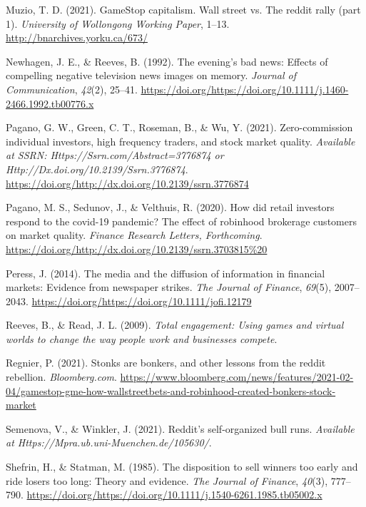 \documentclass[12pt,]{article}
\begin{document}
\leavevmode\hypertarget{ref-dimuzio2021}{}%
Muzio, T. D. (2021). GameStop capitalism. Wall street vs. The reddit
rally (part 1). \emph{University of Wollongong Working Paper}, 1--13.
\url{http://bnarchives.yorku.ca/673/}

\leavevmode\hypertarget{ref-newhagen1992}{}%
Newhagen, J. E., \& Reeves, B. (1992). The evening's bad news: Effects
of compelling negative television news images on memory. \emph{Journal
of Communication}, \emph{42}(2), 25--41.
\url{https://doi.org/https://doi.org/10.1111/j.1460-2466.1992.tb00776.x}

\leavevmode\hypertarget{ref-eaton2021}{}%
Pagano, G. W., Green, C. T., Roseman, B., \& Wu, Y. (2021).
Zero-commission individual investors, high frequency traders, and stock
market quality. \emph{Available at SSRN:
Https://Ssrn.com/Abstract=3776874 or
Http://Dx.doi.org/10.2139/Ssrn.3776874}.
\url{https://doi.org/http://dx.doi.org/10.2139/ssrn.3776874}

\leavevmode\hypertarget{ref-pagano2020}{}%
Pagano, M. S., Sedunov, J., \& Velthuis, R. (2020). How did retail
investors respond to the covid-19 pandemic? The effect of robinhood
brokerage customers on market quality. \emph{Finance Research Letters,
Forthcoming}.
\url{https://doi.org/http://dx.doi.org/10.2139/ssrn.3703815\%20}

\leavevmode\hypertarget{ref-peress2014}{}%
Peress, J. (2014). The media and the diffusion of information in
financial markets: Evidence from newspaper strikes. \emph{The Journal of
Finance}, \emph{69}(5), 2007--2043.
\url{https://doi.org/https://doi.org/10.1111/jofi.12179}

\leavevmode\hypertarget{ref-reeves2009}{}%
Reeves, B., \& Read, J. L. (2009). \emph{Total engagement: Using games
and virtual worlds to change the way people work and businesses
compete}.

\leavevmode\hypertarget{ref-regnier2021}{}%
Regnier, P. (2021). Stonks are bonkers, and other lessons from the
reddit rebellion. \emph{Bloomberg.com}.
\url{https://www.bloomberg.com/news/features/2021-02-04/gamestop-gme-how-wallstreetbets-and-robinhood-created-bonkers-stock-market}

\leavevmode\hypertarget{ref-semenova2021}{}%
Semenova, V., \& Winkler, J. (2021). Reddit's self-organized bull runs.
\emph{Available at Https://Mpra.ub.uni-Muenchen.de/105630/}.

\leavevmode\hypertarget{ref-shefrin1985}{}%
Shefrin, H., \& Statman, M. (1985). The disposition to sell winners too
early and ride losers too long: Theory and evidence. \emph{The Journal
of Finance}, \emph{40}(3), 777--790.
\url{https://doi.org/https://doi.org/10.1111/j.1540-6261.1985.tb05002.x}
\end{document}

